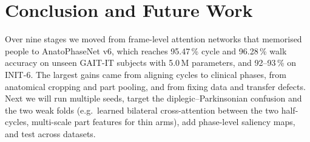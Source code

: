 \documentclass[conference]{IEEEtran}
\begin{document}
\section{Conclusion and Future Work}
Over nine stages we moved from frame-level attention networks that memorised
people to AnatoPhaseNet v6, which reaches 95.47\,\% cycle and 96.28\,\% walk
accuracy on unseen GAIT-IT subjects with 5.0\,M parameters, and 92--93\,\% on
INIT-6. The largest gains came from aligning cycles to clinical phases, from
anatomical cropping and part pooling, and from fixing data and transfer
defects. Next we will run multiple seeds, target the diplegic--Parkinsonian
confusion and the two weak folds (e.g.\ learned bilateral cross-attention
between the two half-cycles, multi-scale part features for thin arms), add
phase-level saliency maps, and test across datasets.
\end{document}
